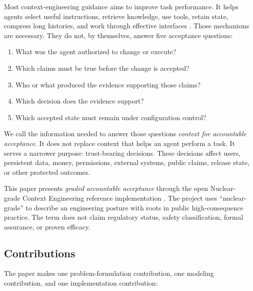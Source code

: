 \documentclass[11pt]{article}
\newcommand{\method}{Nuclear-grade Context Engineering}
\begin{document}
Most context-engineering guidance aims to improve task performance. It helps agents select useful instructions, retrieve knowledge, use tools, retain state, compress long histories, and work through effective interfaces \citep{mei2025context,anthropic2025context,yang2024sweagent}. Those mechanisms are necessary. They do not, by themselves, answer five acceptance questions:

\begin{enumerate}
  \item What was the agent authorized to change or execute?
  \item Which claims must be true before the change is accepted?
  \item Who or what produced the evidence supporting those claims?
  \item Which decision does the evidence support?
  \item Which accepted state must remain under configuration control?
\end{enumerate}

We call the information needed to answer those questions \emph{context for accountable acceptance}. It does not replace context that helps an agent perform a task. It serves a narrower purpose: trust-bearing decisions. These decisions affect users, persistent data, money, permissions, external systems, public claims, release state, or other protected outcomes.

This paper presents \emph{graded accountable acceptance} through the open \method{} reference implementation \citep{flyfission2026repo}. The project uses ``nuclear-grade'' to describe an engineering posture with roots in public high-consequence practice. The term does not claim regulatory status, safety classification, formal assurance, or proven efficacy.

\subsection{Contributions}

The paper makes one problem-formulation contribution, one modeling contribution, and one implementation contribution:
\end{document}

